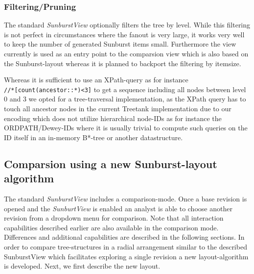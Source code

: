 \begin{itemize}
\subsubsection{Filtering/Pruning}
The standard \emph{SunburstView} optionally filters the tree by level. While this filtering is not perfect in circumstances where the fanout is very large, it works very well to keep the number of generated Sunburst items small. Furthermore the view currently is used as an entry point to the comparsion view which is also based on the Sunburst-layout whereas it is planned to backport the filtering by itemsize.

Whereas it is sufficient to use an XPath-query as for instance \\
\texttt{//*[count(ancestor::*)<3]} to get a sequence including all nodes between level 0 and 3 we opted for a tree-traversal implementation, as the XPath query has to touch all ancestor nodes in the current Treetank implementation due to our encoding which does not utilize hierarchical node-IDs as for instance the ORDPATH/Dewey-IDs where it is usually trivial to compute such queries on the ID itself in an in-memory B*-tree or another datastructure.
\end{itemize}

\subsection{Comparsion using a new Sunburst-layout algorithm}\label{subsec::comparison}
The standard \emph{SunburstView} includes a comparison-mode. Once a base revision is opened and the \emph{SunburtView} is enabled an analyst is able to choose another revision from a dropdown menu for comparison. Note that all interaction capabilities described earlier are also available in the comparison mode. Differences and additional capabilities are described in the following sections. In order to compare tree-structures in a radial arrangement similar to the described SunburstView which facilitates exploring a single revision a new layout-algorithm is developed. Next, we first describe the new layout.


